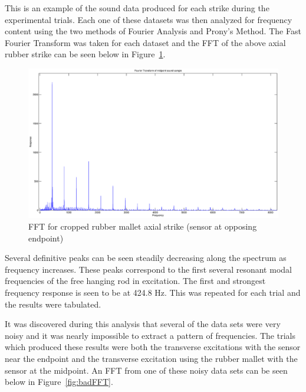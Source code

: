This is an example of the sound data produced for each strike during the experimental trials. Each one of these datasets was then analyzed for frequency content using the two methods of Fourier Analysis and Prony's Method. The Fast Fourier Transform was taken for each dataset and the FFT of the above axial rubber strike can be seen below in Figure~\ref{fig:axial_FFT}.

\begin{figure}[H]
	\centering
	\includegraphics[width=\textwidth]{../figures/axial_rubber_endpointFFT.eps}
	\caption{FFT for cropped rubber mallet axial strike (sensor at opposing endpoint)}
	\label{fig:axial_FFT}
\end{figure}

Several definitive peaks can be seen steadily decreasing along the spectrum as frequency increases. These peaks correspond to the first several resonant modal frequencies of the free hanging rod in excitation. The first and strongest frequency response is seen to be at 424.8 Hz. This was repeated for each trial and the results were tabulated. 

It was discovered during this analysis that several of the data sets were very noisy and it was nearly impossible to extract a pattern of frequencies. The trials which produced these results were both the transverse excitations with the sensor near the endpoint and the transverse excitation using the rubber mallet with the sensor at the midpoint. An FFT from one of these noisy data sets can be seen below in Figure~\ref{fig:badFFT}.


